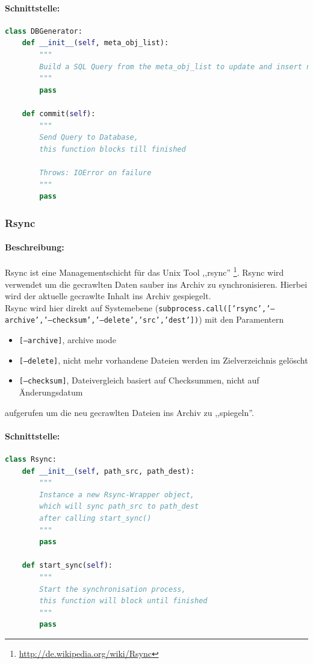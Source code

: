 \paragraph{Schnittstelle:}
\label{par:schnittstelle_}
\begin{lstlisting}[language=python]
class DBGenerator:
    def __init__(self, meta_obj_list):
        """
        Build a SQL Query from the meta_obj_list to update and insert new items the Database 
        """
        pass

    def commit(self):
        """
        Send Query to Database,
        this function blocks till finished

        Throws: IOError on failure
        """
        pass
\end{lstlisting}


\subsubsection{Rsync}
\label{ssub:rsync}
\paragraph{Beschreibung:}
\label{par:beschreibung_}
Rsync ist eine Managementschicht für das Unix Tool ,,rsync'' \footnote{\url{http://de.wikipedia.org/wiki/Rsync}}. Rsync wird verwendet um die gecrawlten Daten sauber ins Archiv zu synchronisieren.
Hierbei wird der aktuelle gecrawlte Inhalt ins Archiv gespiegelt.
\\
Rsync wird hier direkt auf Systemebene (\texttt{subprocess.call(['rsync','--archive','--checksum','--delete','src','dest'])}) mit den Paramentern
\begin{itemize}
    \item \texttt{[--archive]}, archive mode
    \item \texttt{[--delete]}, nicht mehr vorhandene Dateien werden im Zielverzeichnis gelöscht
    \item \texttt{[--checksum]}, Dateivergleich basiert auf Checksummen, nicht auf Änderungsdatum
\end{itemize}
aufgerufen um die neu gecrawlten Dateien ins Archiv zu ,,spiegeln''.

\paragraph{Schnittstelle:}
\label{par:schnittstelle_}
\begin{lstlisting}[language=python]
class Rsync:
    def __init__(self, path_src, path_dest):
        """
        Instance a new Rsync-Wrapper object,
        which will sync path_src to path_dest
        after calling start_sync() 
        """
        pass

    def start_sync(self):
        """
        Start the synchronisation process,
        this function will block until finished
        """
        pass
\end{lstlisting}

